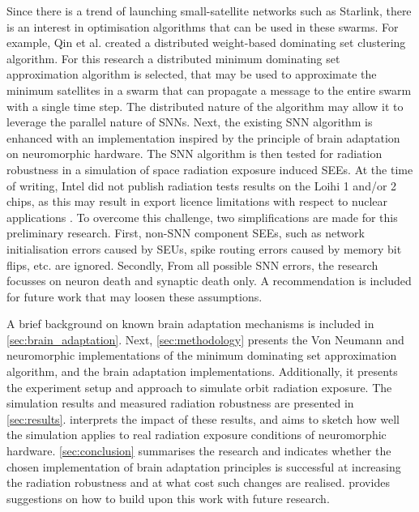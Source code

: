 Since there is a trend of launching small-satellite networks such as Starlink, there is an interest in optimisation algorithms that can be used in these swarms. For example, Qin et al. created a distributed weight-based dominating set clustering algorithm\cite{todo}.%
For this research a distributed minimum dominating set approximation algorithm is selected, that may be used to approximate the minimum satellites in a swarm that can propagate a message to the entire swarm with a single time step. The distributed nature of the algorithm may allow it to leverage the parallel nature of SNNs.
Next, the existing SNN algorithm is enhanced with an implementation inspired by the principle of brain adaptation on neuromorphic hardware. The SNN algorithm is then tested for radiation robustness in a simulation of space radiation exposure induced SEEs. At the time of writing, Intel did not publish radiation tests results on the Loihi 1 and/or 2 chips, as this may result in export licence limitations with respect to nuclear applications \cite{inrc_meeting}. To overcome this challenge, two simplifications are made for this preliminary research. First, non-SNN component SEEs, such as network initialisation errors caused by SEUs, spike routing errors caused by memory bit flips, etc. are ignored. Secondly, From all possible SNN errors, the research focusses on neuron death and synaptic death only. A recommendation is included for future work that may loosen these assumptions. %

A brief background on known brain adaptation mechanisms is included in \cref{sec:brain_adaptation}. Next, \cref{sec:methodology} presents the Von Neumann and neuromorphic implementations of the minimum dominating set approximation algorithm, and the brain adaptation implementations. Additionally, it presents the experiment setup and approach to simulate orbit radiation exposure. The simulation results and measured radiation robustness are presented in \cref{sec:results}.  interprets the impact of these results, and aims to sketch how well the simulation applies to real radiation exposure conditions of neuromorphic hardware. \cref{sec:conclusion} summarises the research and indicates whether the chosen implementation of brain adaptation principles is successful at increasing the radiation robustness and at what cost such changes are realised. provides suggestions on how to build upon this work with future research. %